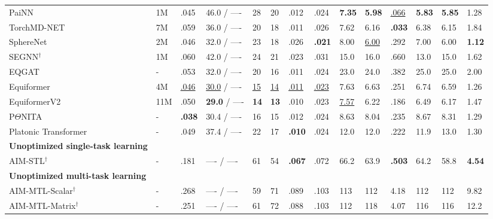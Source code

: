 \documentclass{article}
\theoremstyle{plain}
\theoremstyle{definition}
\theoremstyle{remark}
\begin{document}
\begin{table}[t]
{\begin{tabular}{llllllllllllll}
PaiNN               & 1M & .045 & 46.0 / ---- & 28 & 20 & .012 & .024 & \textbf{7.35} & \textbf{5.98} & \underline{.066} & \textbf{5.83} & \textbf{5.85} & 1.28 \\
TorchMD-NET   & 7M & .059 & 36.0 / ---- & 20 & 18 & .011 & .026 & 7.62 & 6.16 & \textbf{.033} & 6.38 & 6.15 & 1.84 \\
SphereNet              & 2M & .046 & 32.0 / ---- & 23 & 18 & .026 & \textbf{.021} & 8.00    & \underline{6.00}    & .292 & 7.00   & 6.00   & \textbf{1.12} \\
SEGNN$^\dagger$ & 1M & .060 & 42.0 / ---- & 24 & 21 & .023 & .031 & 15.0   & 16.0   & .660 & 13.0  & 15.0  & 1.62 \\
EQGAT                   & - & .053 & 32.0 / ---- & 20 & 16 & .011 & .024 & 23.0   & 24.0   & .382 & 25.0  & 25.0  & 2.00 \\
Equiformer          & 4M & \underline{.046} & \underline{30.0} / ---- & \underline{15} & \underline{14} & \underline{.011} & \underline{.023} & 7.63 & 6.63 & .251 & 6.74 & 6.59 & 1.26 \\
EquiformerV2          & 11M & .050 & \textbf{29.0} / ---- & \textbf{14} & \textbf{13} & .010 & .023 & \underline{7.57} & 6.22 & .186 & 6.49 & 6.17 & 1.47 \\
P$\Theta$NITA   & - & \textbf{.038} & 30.4 / ---- & 16 & 15 & .012 & .024 & 8.63 & 8.04 & .235 & 8.67 & 8.31 & 1.29 \\
Platonic Transformer         & - & .049 & 37.4 / ---- & 22 & 17 & \textbf{.010} & .024 & 12.0 & 12.0 & .222 & 11.9 & 13.0 & 1.30 \\
\midrule
\textbf{Unoptimized single-task learning} \\
AIM-STL$^\dagger$         & - & .181 & ---- / ---- & 61 & 54 & \textbf{.067} & .072 & 66.2 & 63.9 & \textbf{.503} & 64.2 & 58.8 & \textbf{4.54} \\
\textbf{Unoptimized multi-task learning} \\
AIM-MTL-Scalar$^\dagger$         & - & .268 & ---- / ---- & 59 & 71 & .089 & .103 & 113 & 112 & 4.18 & 112 & 112 & 9.82 \\
AIM-MTL-Matrix$^\dagger$         & - & .251 & ---- / ---- & 61 & 72 & .088 & .103 & 112 & 118 & 4.07 & 116 & 116 & 12.2 \\

\end{tabular}}
\end{table}
\end{document}
